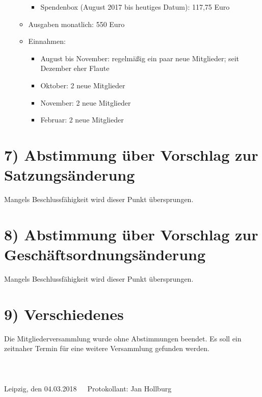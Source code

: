 \documentclass[10pt,a4paper]{scrartcl}
\newcommand{\eventdate}{04.03.2018}
\newcommand{\schriftfuehrer}{Jan Hollburg}
\begin{document}
\begin{itemize}
\begin{itemize}
\begin{itemize}
				\item Spendenbox (August 2017 bis heutiges Datum): 117,75 Euro
			\end{itemize}
			\item Ausgaben monatlich: 550 Euro
			\item Einnahmen:
			\begin{itemize}
				\item August bis November: regelm{\"a}{\ss}ig ein paar neue Mitglieder; seit Dezember eher Flaute
				\item Oktober: 2 neue Mitglieder
				\item November: 2 neue Mitglieder
				\item Februar: 2 neue Mitglieder
			\end{itemize}
		\end{itemize}
	\end{itemize}

\section*{7) Abstimmung {\"u}ber Vorschlag zur Satzungs{\"a}nderung}
	Mangels Beschlussf{\"a}higkeit wird dieser Punkt {\"u}bersprungen.

\section*{8) Abstimmung {\"u}ber Vorschlag zur Gesch{\"a}ftsordnungs{\"a}nderung}
	Mangels Beschlussf{\"a}higkeit wird dieser Punkt {\"u}bersprungen.

\section*{9) Verschiedenes}
	Die Mitgliederversammlung wurde ohne Abstimmungen beendet. Es soll ein
	zeitnaher Termin f{\"u}r eine weitere Versammlung gefunden werden.
\\
\\
\\
\\
Leipzig, den \eventdate \ \ \ Protokollant: \schriftfuehrer
\end{document}
